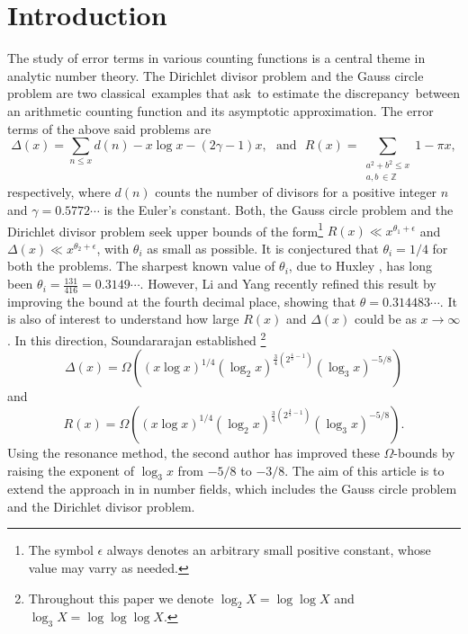 \documentclass[reqno]{amsart}
\numberwithin{equation}{section}
\theoremstyle{plain}
\begin{document}
	\section{Introduction}
	The study of error terms in various counting functions is a central theme in analytic number theory. The Dirichlet divisor problem and the Gauss circle problem are two classical examples that ask to estimate the discrepancy between an arithmetic counting function and its asymptotic approximation. 
	The error terms of the above said problems are 
	\begin{equation}\label{Circle and Divisor Problem}
\Delta(x) = \sum_{n\leq x} d(n) -x\log x -(2\gamma -1)x,	 \ \ \ \text{and} \ \ \	R(x) = \sum_{\substack{{a^2+b^2\leq x}\\ a,b \, \in \mathbb{Z}}}1 - \pi x,
	\end{equation}
respectively, where $d(n)$ counts the number of divisors for a positive integer $n$ and $\gamma=0.5772\cdots$ is the Euler's constant. Both, the Gauss circle problem and  the Dirichlet divisor problem seek upper bounds of the form\footnote{The symbol $\epsilon$ always denotes an arbitrary small positive constant, whose value may varry as needed.}  $R(x)\ll x^{\theta_1+\epsilon}$ and $\Delta(x)\ll x^{\theta_2 +\epsilon}$, with $\theta_i$  as small as possible. It is conjectured that $\theta_i =1/4$ for both the problems. The sharpest known value of $\theta_i$, due to Huxley \cite{Huxley 2, Huxley 3}, has long been $\theta_i = \frac{131}{416} = 0.3149\cdots$. However, Li and Yang \cite{Li- Yang } recently refined this result by improving the bound at the fourth decimal place, showing that $\theta = 0.314483\cdots$.
 It is also of interest to understand how large $R(x)$ and $\Delta(x)$ could be as $x \to \infty$. In this direction, Soundararajan \cite{Sound} established \footnote{Throughout this paper we denote  $\log_2 X = \log \log X$ and $\log_3 X= \log \log \log X$.}  
	\begin{equation*}
		\Delta(x) = \Omega\left((x\log x)^{1/4} (\log_2 x)^{\frac{3}{4}(2^{\frac{4}{3}-1})}(\log_3 x)^{-5/8}\right)
	\end{equation*}
	and 
		\begin{equation*}
		R(x) = \Omega\left((x\log x)^{1/4} (\log_2 x)^{\frac{3}{4}(2^{\frac{4}{3}-1})}(\log_3 x)^{-5/8}\right).
	\end{equation*}
	Using the resonance method, the second author \cite{K. Mahatab} has improved these $\Omega$-bounds by raising the exponent of $\log_3 x$  from $-5/8$ to $-3/8$. The aim of this article is to extend the approach in \cite{K. Mahatab} in number fields, which includes the Gauss circle problem and the Dirichlet divisor problem.
	
\end{document}
